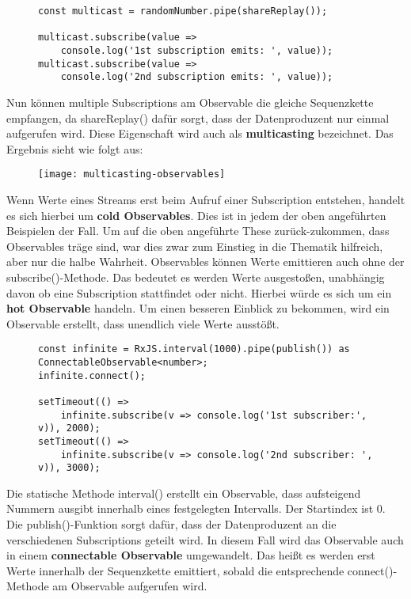 \begin{figure}[H]
\begin{lstlisting}[basicstyle=\small]
const multicast = randomNumber.pipe(shareReplay());

multicast.subscribe(value =>
    console.log('1st subscription emits: ', value));
multicast.subscribe(value =>
    console.log('2nd subscription emits: ', value));
\end{lstlisting}
\end{figure}

\noindent
Nun können multiple Subscriptions am Observable die gleiche Sequenzkette empfangen, da shareReplay() dafür sorgt, dass der Datenproduzent nur einmal aufgerufen wird. Diese Eigenschaft wird auch als \textbf{multicasting} bezeichnet. Das Ergebnis sieht wie folgt aus:

\begin{figure}[H]
\begin{center}
\texttt{[image: multicasting-observables]}
\end{center}
\end{figure}

\noindent
Wenn Werte eines Streams erst beim Aufruf einer Subscription entstehen, handelt es sich hierbei um \textbf{cold Observables}.\cite{hot-vs-cold} Dies ist in jedem der oben angeführten Beispielen der Fall. Um auf die oben angeführte These zurück-zukommen, dass Observables träge sind, war dies zwar zum Einstieg in die Thematik hilfreich, aber nur die halbe Wahrheit. Observables können Werte emittieren auch ohne der subscribe()-Methode. Das bedeutet es werden Werte ausgestoßen, unabhängig davon ob eine Subscription stattfindet oder nicht. Hierbei würde es sich um ein \textbf{hot Observable} handeln. Um einen besseren Einblick zu bekommen, wird ein Observable erstellt, dass unendlich viele Werte ausstößt.

\begin{figure}[H]
\begin{lstlisting}[basicstyle=\small]
const infinite = RxJS.interval(1000).pipe(publish()) as ConnectableObservable<number>;
infinite.connect();

setTimeout(() =>
    infinite.subscribe(v => console.log('1st subscriber:', v)), 2000);
setTimeout(() =>
    infinite.subscribe(v => console.log('2nd subscriber: ', v)), 3000);
\end{lstlisting}
\end{figure}

\noindent
Die statische Methode interval() erstellt ein Observable, dass aufsteigend Nummern ausgibt innerhalb eines festgelegten Intervalls. Der Startindex ist 0. Die publish()-Funktion sorgt dafür, dass der Datenproduzent an die verschiedenen Subscriptions geteilt wird. In diesem Fall wird das Observable auch in einem \textbf{connectable Observable} umgewandelt. Das heißt es werden erst Werte innerhalb der Sequenzkette emittiert, sobald die entsprechende connect()-Methode am Observable aufgerufen wird.\\

